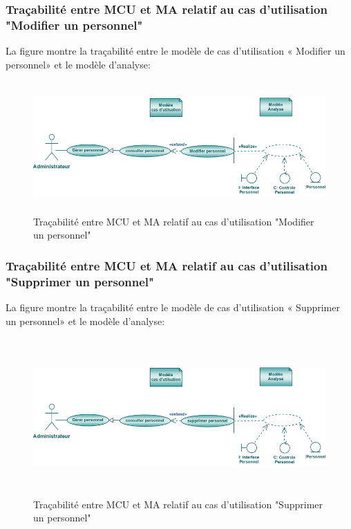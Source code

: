 \documentclass[12 pt ]{report}
\begin{document}
\subsubsection{Traçabilité entre MCU et MA relatif au cas d’utilisation "Modifier un personnel" }
La figure  montre la traçabilité entre le modèle de cas d’utilisation « Modifier un personnel» et le modèle
d’analyse:
\begin{figure}[h]
\begin{center}
\includegraphics[width= 14cm , height =5cm]{tma.png}
\caption{Traçabilité entre MCU et MA relatif au cas d’utilisation "Modifier un personnel"}
\end{center}
\end{figure}

\subsubsection{Traçabilité entre MCU et MA relatif au cas d’utilisation "Supprimer un personnel" }
La figure  montre la traçabilité entre le modèle de cas d’utilisation « Supprimer un personnel» et le modèle
d’analyse:
\begin{figure}[h]
\begin{center}
\includegraphics[width= 14cm , height =6cm]{tracsupp.png}
\caption{Traçabilité entre MCU et MA relatif au cas d’utilisation "Supprimer un personnel" }
\end{center}
\end{figure} 
\end{document}
